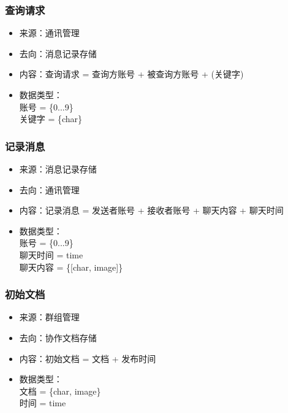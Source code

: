             \subsubsection{查询请求}
            \begin{itemize}
            \item 来源：通讯管理
            \item 去向：消息记录存储
            \item 内容：查询请求 = 查询方账号 + 被查询方账号 + (关键字)
            \item 数据类型：\\
            账号 = \{0...9\}\\
            关键字 = \{char\}\\
            \end{itemize}

            \subsubsection{记录消息}
            \begin{itemize}
            \item 来源：消息记录存储
            \item 去向：通讯管理
            \item 内容：记录消息 = 发送者账号 + 接收者账号 + 聊天内容 + 聊天时间
            \item 数据类型：\\
            账号 = \{0...9\}\\
            聊天时间 = time\\
            聊天内容 = \{[char, image]\}\\
            \end{itemize}
            \subsubsection{初始文档}
            \begin{itemize}
            \item 来源：群组管理
            \item 去向：协作文档存储
            \item 内容：初始文档 = 文档 + 发布时间
            \item 数据类型：\\
            文档 = \{char, image\}\\
            时间 = time\\
            
            \end{itemize}

